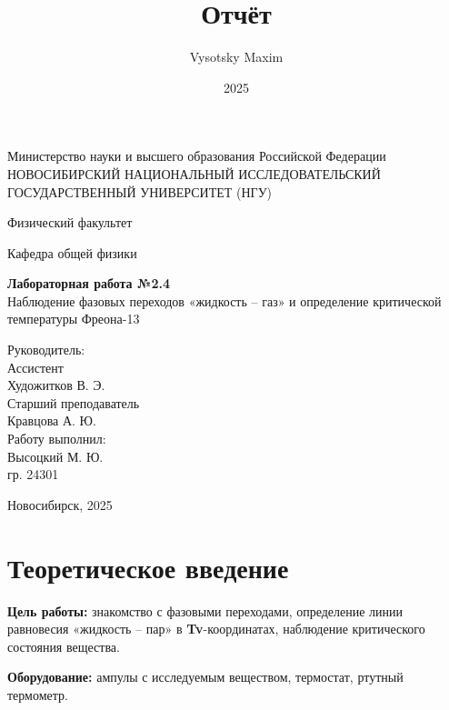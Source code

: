 \documentclass[a4paper,14pt]{article}
\author{Vysotsky Maxim}
\title{Отчёт}
\date{2025}
\begin{document}
	\begin{titlepage}
		\begin{center}
			{Министерство науки и высшего образования Российской Федерации
				НОВОСИБИРСКИЙ НАЦИОНАЛЬНЫЙ ИССЛЕДОВАТЕЛЬСКИЙ
				ГОСУДАРСТВЕННЫЙ УНИВЕРСИТЕТ (НГУ)}
		\end{center}
		\begin{center}
			{Физический факультет}
		\end{center}
		\begin{center}
			{Кафедра общей физики}
		\end{center}
		
		
		\vspace{7cm}
		{
			\begin{center}
				{\bf Лабораторная работа №2.4}\\
			Наблюдение фазовых переходов «жидкость – газ» и определение
критической температуры Фреона-13
			\end{center}
		}
		\vspace{2cm}
		\begin{flushright}
			{Руководитель:\\ Ассистент\\
				Художитков В. Э.\\
                Старший преподаватель \\
                Кравцова А. Ю.\\
				Работу выполнил:\\
				Высоцкий М. Ю.\\
				\vspace{0.2cm}
				гр. 24301}
		\end{flushright}
		\vspace{3cm}
		\begin{center}
			Новосибирск, 2025
		\end{center}
	\end{titlepage}


\section{Теоретическое введение}

\hspace{\parindent}\textbf{Цель работы:} знакомство с фазовыми переходами, определение
линии равновесия «жидкость – пар» в \textbf{Tv}-координатах, наблюдение
критического состояния вещества.

\textbf{Оборудование:} ампулы с исследуемым веществом, термостат,
ртутный термометр.
\end{document}
